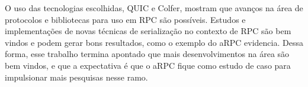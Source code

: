 O uso das tecnologias escolhidas, QUIC e Colfer, mostram que avanços na área de protocolos e bibliotecas para uso em RPC são possíveis. Estudos e implementações de novas técnicas de serialização no contexto de RPC são bem vindos e podem gerar bons resultados, como o exemplo do aRPC evidencia. Dessa forma, esse trabalho termina apontado que mais desenvolvimentos na área são bem vindos, e que a expectativa é que o aRPC fique como estudo de caso para impulsionar mais pesquisas nesse ramo.










